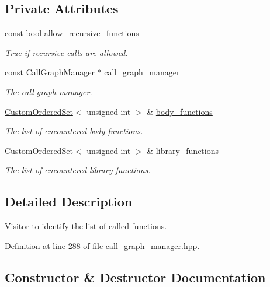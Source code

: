 \subsection*{Private Attributes}
\begin{DoxyCompactItemize}
\item 
const bool \hyperlink{structCalledFunctionsVisitor_adacde9fcc83c0f8944a62e307b706a12}{allow\+\_\+recursive\+\_\+functions}
\begin{DoxyCompactList}\small\item\em True if recursive calls are allowed. \end{DoxyCompactList}\item 
const \hyperlink{classCallGraphManager}{Call\+Graph\+Manager} $\ast$ \hyperlink{structCalledFunctionsVisitor_a1b3c58fef5ca0bcf71281c9b721d46fa}{call\+\_\+graph\+\_\+manager}
\begin{DoxyCompactList}\small\item\em The call graph manager. \end{DoxyCompactList}\item 
\hyperlink{classCustomOrderedSet}{Custom\+Ordered\+Set}$<$ unsigned int $>$ \& \hyperlink{structCalledFunctionsVisitor_a247b847cc5d88746e63c54d0297048d3}{body\+\_\+functions}
\begin{DoxyCompactList}\small\item\em The list of encountered body functions. \end{DoxyCompactList}\item 
\hyperlink{classCustomOrderedSet}{Custom\+Ordered\+Set}$<$ unsigned int $>$ \& \hyperlink{structCalledFunctionsVisitor_ad67878eadef3ee07427510ce4c8e8aaf}{library\+\_\+functions}
\begin{DoxyCompactList}\small\item\em The list of encountered library functions. \end{DoxyCompactList}\end{DoxyCompactItemize}


\subsection{Detailed Description}
Visitor to identify the list of called functions. 

Definition at line 288 of file call\+\_\+graph\+\_\+manager.\+hpp.



\subsection{Constructor \& Destructor Documentation}
\mbox{\label{structCalledFunctionsVisitor_a8c3cc576a9dbbd23428f3d95c08a2723}} 
